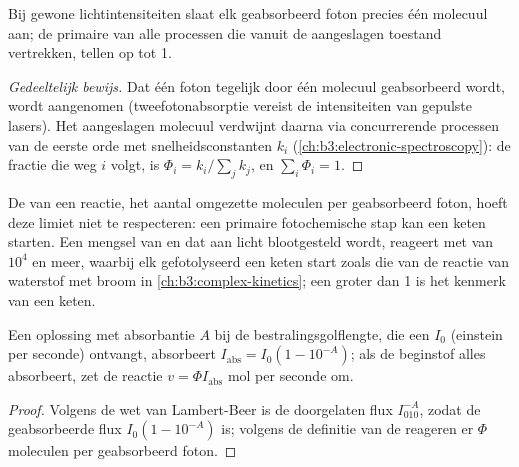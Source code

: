\begin{proposition}\label{prop:b3:photochemistry:stark-einstein}
Bij gewone lichtintensiteiten slaat elk geabsorbeerd foton precies één
molecuul aan; de primaire  van alle processen die
vanuit de aangeslagen toestand vertrekken, tellen op tot 1.
\end{proposition}

\begin{proof}[Gedeeltelijk bewijs]
Dat één foton tegelijk door één molecuul geabsorbeerd wordt, wordt
aangenomen (tweefotonabsorptie vereist de intensiteiten van gepulste
lasers). Het aangeslagen molecuul verdwijnt daarna via concurrerende
processen van de eerste orde met snelheidsconstanten $k_i$
(\cref{ch:b3:electronic-spectroscopy}): de fractie die weg $i$ volgt, is $\Phi_i =
k_i/\sum_jk_j$, en $\sum_i\Phi_i = 1$.
\end{proof}

De  van een reactie, het aantal omgezette moleculen per
geabsorbeerd foton, hoeft deze limiet niet te respecteren: een primaire
fotochemische stap kan een keten starten. Een mengsel van  en
 dat aan licht blootgesteld wordt, reageert met
 van $10^4$ en meer, waarbij elk gefotolyseerd
 een keten start zoals die van de reactie van waterstof met broom
in \cref{ch:b3:complex-kinetics}; een  groter dan 1 is
het kenmerk van een keten.

\begin{proposition}\label{prop:b3:photochemistry:rate}
Een oplossing met absorbantie $A$ bij de bestralingsgolflengte, die een
 $I_0$ (einstein per seconde) ontvangt, absorbeert $I_{\mathrm{abs}} = I_0(1 - 10^{-A})$; als de
beginstof alles absorbeert, zet de reactie $v = \Phi I_{\mathrm{abs}}$ mol per seconde om.
\end{proposition}

\begin{proof}
Volgens de wet van Lambert-Beer is de doorgelaten flux $I_010^{-A}$, zodat
de geabsorbeerde flux
$I_0(1 - 10^{-A})$ is; volgens de definitie van de 
reageren er $\Phi$ moleculen per geabsorbeerd foton.
\end{proof}

